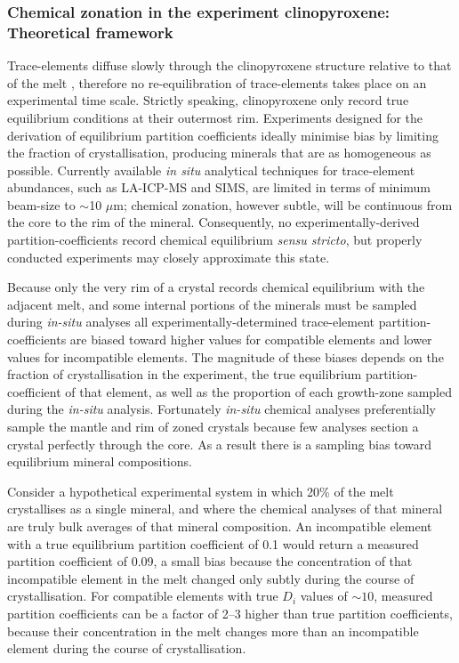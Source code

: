 \documentclass[review,authoryear,12pt]{elsarticle}
\begin{document}
\subsubsection{Chemical zonation in the experiment clinopyroxene: Theoretical framework}
Trace-elements diffuse slowly through the clinopyroxene structure relative to that of the melt \citep{VanOrman2001, Zhang2010}, therefore no re-equilibration of trace-elements takes place on an experimental time scale. Strictly speaking, clinopyroxene only record true equilibrium conditions at their outermost rim. 
     Experiments designed for the derivation of equilibrium partition coefficients ideally minimise bias by limiting the fraction of crystallisation, producing minerals that are as homogeneous as possible. Currently available \textit{in situ} analytical techniques for trace-element abundances, such as LA-ICP-MS and SIMS, are limited in terms of minimum beam-size to $\sim$10 $\mu$m; chemical zonation, however subtle, will be continuous from the core to the rim of the mineral. Consequently, no experimentally-derived partition-coefficients record chemical equilibrium \textit{sensu stricto}, but properly conducted experiments may closely approximate this state.

Because only the very rim of a crystal records chemical equilibrium with the adjacent melt, and some internal portions of the minerals must be sampled during \textit{in-situ} analyses all experimentally-determined trace-element partition-coefficients are biased toward higher values for compatible elements and lower values for incompatible elements. The magnitude of these biases depends on the fraction of crystallisation in the experiment, the true equilibrium partition-coefficient of that element, as well as the proportion of each growth-zone sampled during the \textit{in-situ} analysis. Fortunately \textit{in-situ} chemical analyses preferentially sample the mantle and rim of zoned crystals because few analyses section a crystal perfectly through the core. As a result there is a sampling bias toward equilibrium mineral compositions.


	Consider a hypothetical experimental system in which 20\% of the melt crystallises as a single mineral, and where the chemical analyses of that mineral are truly bulk averages of that mineral composition. An incompatible element with a true equilibrium partition coefficient of 0.1 would return a measured partition coefficient of 0.09, a small bias because the concentration of that incompatible element in the melt changed only subtly during the course of crystallisation. For compatible elements with true $D_i$ values of $\sim 10$, measured partition coefficients can be a factor of 2--3 higher than true partition coefficients, because their concentration in the melt changes more than an incompatible element during the course of crystallisation.
\end{document}
